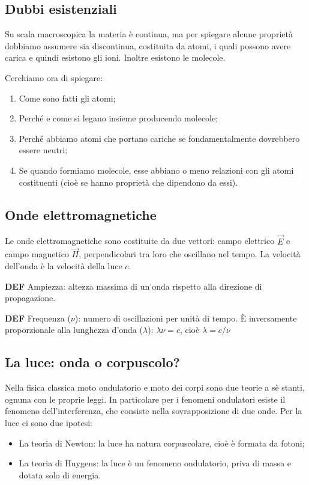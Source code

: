 \subsection{Dubbi esistenziali}
Su scala macroscopica la materia è continua, ma per spiegare alcune proprietà dobbiamo assumere sia discontinua, costituita da atomi, i quali possono avere carica e quindi esistono gli ioni. Inoltre esistono le molecole.

Cerchiamo ora di spiegare:
\begin{enumerate}
    \item Come sono fatti gli atomi;
    \item Perché e come si legano insieme producendo molecole;
    \item Perché abbiamo atomi che portano cariche se fondamentalmente dovrebbero essere neutri;
    \item Se quando formiamo molecole, esse abbiano o meno relazioni con gli atomi costituenti (cioè se hanno proprietà che dipendono da essi).
  \end{enumerate}
  
  \subsection{Onde elettromagnetiche}
Le onde elettromagnetiche sono costituite da due vettori: campo elettrico $\vec{E}$ e campo magnetico $\vec{H}$, perpendicolari tra loro che oscillano nel tempo. La velocità dell'onda è la velocità della luce $c$.

\textbf{DEF} Ampiezza: altezza massima di un'onda rispetto alla direzione di propagazione. 

\textbf{DEF} Frequenza ($\nu$): numero di oscillazioni per unità di tempo. È inversamente proporzionale alla lunghezza d'onda ($\lambda$): $\lambda\nu=c$, cioè $\lambda=c/\nu$

\subsection{La luce: onda o corpuscolo?}
Nella fisica classica moto ondulatorio e moto dei corpi sono due teorie a sè stanti, ognuna con le proprie leggi.
In particolare per i fenomeni ondulatori esiste il fenomeno dell'interferenza, che consiste nella sovrapposizione di due onde.
Per la luce ci sono due ipotesi:
\begin{itemize}
  \item  La teoria di Newton: la luce ha natura corpuscolare, cioè è formata da fotoni;
  \item  La teoria di Huygens: la luce è un fenomeno ondulatorio, priva di massa e dotata solo di energia.
\end{itemize}
